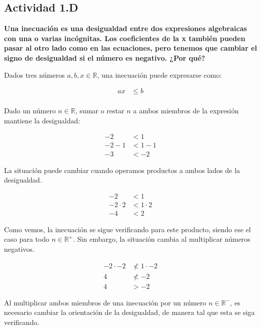 \subsection*{Actividad 1.D}
\textbf{Una inecuación es una desigualdad entre dos expresiones
algebraicas con una o varias incógnitas. 
Los coeficientes de la x también pueden pasar al otro lado como en
las ecuaciones, pero tenemos que cambiar el signo de
desigualdad si el número es negativo. ¿Por qué?}

Dados tres números $a, b, x \in \mathbb{R}$, una inecuación puede expresarse como:

\begin{align*}
	ax &\leq b\\
\end{align*}

Dado un número $n \in \mathbb{R}$, sumar o restar $n$ a ambos miembros de la expresión mantiene la desigualdad:

\begin{align*}
	-2 &< 1\\
	-2 - 1 &< 1 - 1\\
	-3 &< -2
\end{align*}

La situación puede cambiar cuando operamos productos a ambos lados de la desigualdad.

\begin{align*}
	-2 &< 1\\
	-2 \cdot 2 &< 1 \cdot 2\\
	-4 &< 2
\end{align*}

Como vemos, la inecuación se sigue verificando para este producto, siendo ese el caso para todo $n \in \mathbb{R^+}$. Sin embargo, la situación cambia al multiplicar números negativos.

\begin{align*}
	-2 \cdot -2 &\not < 1 \cdot -2\\
	4 &\not < -2\\
	4 &> -2
\end{align*}

Al multiplicar ambos miembros de una inecuación por un número $n \in \mathbb{R^-}$, es necesario cambiar la orientación de la desigualdad, de manera tal que esta se siga verificando.
